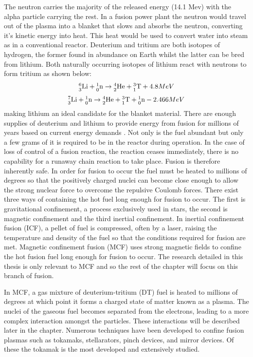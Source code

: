 	
	The neutron carries the majority of the released energy (14.1 Mev) with the alpha particle carrying the rest. In a fusion power plant the neutron would travel out of the plasma into a blanket that slows and absorbs the neutron, converting it's kinetic energy into heat. This heat would be used to convert water into steam as in a conventional reactor.
	Deuterium and tritium are both isotopes of hydrogen, the former found in abundance on Earth whilst the latter can be bred from lithium. Both naturally occurring isotopes of lithium react with neutrons to form tritium as shown below: 
\begin{equation}
	\nucl{6}{3}{Li} + \nucl{1}{0}{n} \to  \nucl{4}{2}{He} + \nucl{3}{1}{T}  +4.8MeV
\end{equation}
\begin{equation}
	\nucl{7}{3}{Li} + \nucl{1}{0}{n} \to  \nucl{4}{2}{He} + \nucl{3}{1}{T} + \nucl{1}{0}{n} -2.466MeV
\end{equation}
making lithium an ideal candidate for the blanket material.  There are enough supplies of deuterium and lithium to provide energy from fusion for millions of years based on current energy demands \cite{fusion_fuel}. Not only is the fuel abundant but only a few grams of it is required to be in the reactor during operation. In the case of loss of  control of a fusion reaction, the reaction ceases immediately, there is no capability for a runaway chain reaction to take place. Fusion is therefore inherently safe. 
	In order for fusion to occur the fuel must be heated to millions of degrees so that the positively charged nuclei can become close enough to allow the strong nuclear force to overcome the repulsive Coulomb forces. There exist three ways of containing the hot fuel long enough for fusion to occur. The first is gravitational confinement, a process exclusively used in stars, the second is magnetic confinement and the third inertial confinement. In inertial confinement fusion (ICF), a pellet of fuel is compressed, often by a laser, raising the temperature and density of the fuel so that the conditions required for fusion are met. Magnetic confinement fusion (MCF) uses strong magnetic fields to confine the hot fusion fuel long enough for fusion to occur. The research detailed in this thesis is only relevant to MCF and so the rest of the chapter will focus on this branch of fusion.
	
	In MCF, a gas mixture of deuterium-tritium (DT) fuel is heated to millions of degrees at which point it forms a charged state of matter known as a plasma. The nuclei of the gaseous fuel becomes separated from the electrons, leading to a more complex interaction amongst the particles. These interactions will be described later in the chapter. Numerous techniques have been developed to confine fusion plasmas such as tokamaks, stellarators, pinch devices, and mirror devices. Of these the tokamak is the most developed and extensively studied.
	
